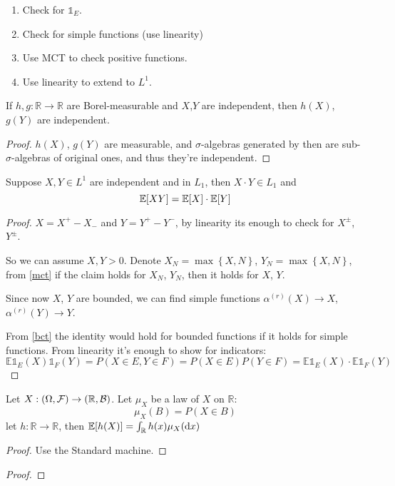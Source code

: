 \begin{prop}
	\begin{enumerate}
		\item Check for $\mathds{1}_E$.
		\item Check for simple functions (use linearity)
		\item Use MCT to check positive functions.
		\item Use linearity to extend to $L^1$. 
	\end{enumerate}
\end{prop}
\begin{prop}
	If $h,g: \mathbb{R}\to \mathbb{R}$ are Borel-measurable and $X$,$Y$ are independent, then $h(X)$, $g(Y)$ are independent.
	\begin{proof}
		$h(X)$, $g(Y)$ are measurable, and $\sigma$-algebras generated by then are sub-$\sigma$-algebras of original ones, and thus they're independent.
	\end{proof}
\end{prop}
\begin{prop}
	Suppose $X,Y \in L^1$ are independent and in $L_1$, then $X\cdot Y \in L_1$ and
	$$\mathbb{E}\qty[XY] = \mathbb{E}\qty[X] \cdot \mathbb{E}\qty[Y]$$
	
	\begin{proof}
		$X=X^+-X_-$ and $Y=Y^+-Y^-$, by linearity its enough to check for $X^{\pm}$, $Y^\pm$.
		
		So we can assume $X,Y>0$. Denote $X_N = \max\left\{ X, N \right\}$, $Y_N = \max\left\{ X, N \right\}$, from \ref{mct} if the claim holds for $X_N$, $Y_N$, then it holds for $X$, $Y$.
		
		Since now $X$, $Y$ are bounded, we can find simple functions $\alpha^{(r)}(X) \to X$, $\alpha^{(r)}(Y) \to Y$. 
		
		From \ref{bct} the identity would hold for bounded functions if it holds for simple functions. From linearity it's enough to show for indicators:
		$$\mathbb{E} \mathds{1}_E(X) \mathds{1}_F(Y)  = P(X \in E, Y\in F) = P(X\in E)P(Y\in F) = \mathbb{E} \mathds{1}_E(X) \cdot \mathbb{E}  \mathds{1}_F(Y)$$
	\end{proof}
\end{prop}

\begin{prop}
	Let $X: (\Omega, \mathcal{F}) \to \qty(\mathbb{R}, \mathcal{B})$. Let $\mu_X$ be a law of $X$ on $\mathbb{R}$:
	$$\mu_X(B) = P(X\in B)$$
	let $h: \mathbb{R} \to \mathbb{R}$, then $\mathbb{E}\qty[h(X)] = \int_{\mathbb{R}} h(x) \mu_X(\dd{x})$
	\begin{proof}
		Use the Standard machine.
	\end{proof}
 	\begin{proof}
	\end{proof}
\end{prop}

